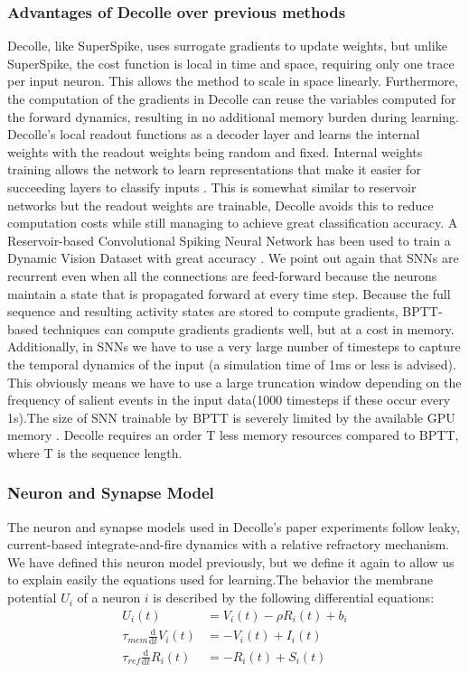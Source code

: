 \documentclass[12pt]{report}
\begin{document}
\subsubsection{Advantages of Decolle over previous methods}
Decolle, like SuperSpike, uses surrogate gradients to update weights, but unlike SuperSpike, the cost function is local in time and space, requiring only one trace per input neuron. This allows the method to scale in space linearly. Furthermore, the computation of the gradients in Decolle can reuse the variables computed for the forward dynamics, resulting in no additional memory burden during learning. Decolle's local readout functions as a decoder layer and learns the internal weights with the readout weights being random and fixed. Internal weights training allows the network to learn representations that make it easier for succeeding layers to classify inputs \cite{neftci2017} . This is somewhat similar to reservoir networks but the readout weights are trainable, Decolle avoids this to reduce computation costs while still managing to achieve great classification accuracy. A Reservoir-based Convolutional Spiking Neural Network has been used to train a Dynamic Vision Dataset with great accuracy \cite{george2020}. We point out again  that SNNs are recurrent even when all the connections are feed-forward because the neurons maintain a state that is propagated forward at every time step. Because the full sequence and resulting activity states are stored to compute gradients, BPTT-based techniques can compute gradients gradients well, but at a cost in memory. Additionally, in SNNs we have to use a very large number of timesteps to capture the temporal dynamics of the input (a simulation time of 1ms or less is advised). This obviously means we have to use a large truncation window depending on the frequency of salient events in the input data(1000 timesteps if these occur every 1s).The size of SNN trainable by BPTT is severely limited by the available GPU memory  \cite{ochard2018} .   Decolle requires an order T less memory resources compared to BPTT, where T is the sequence length.

\subsubsection{Neuron and Synapse Model}
The neuron and synapse models used in Decolle's paper experiments follow leaky, current-based integrate-and-fire dynamics with a relative refractory mechanism. We have defined this neuron model previously, but we define it again to allow us to explain easily the equations used for learning.The behavior the membrane potential $U_{i}$ of a neuron $i$ is described by the following differential equations:
\begin{equation}
\begin{aligned}
U_{i}(t) &=V_{i}(t)-\rho R_{i}(t)+b_{i} \\
\tau_{m e m} \frac{\mathrm{d}}{\mathrm{d} t} V_{i}(t) &=-V_{i}(t)+I_{i}(t) \\
\tau_{r e f} \frac{\mathrm{d}}{\mathrm{d} t} R_{i}(t) &=-R_{i}(t)+S_{i}(t)
\end{aligned}
\end{equation}
\end{document}
